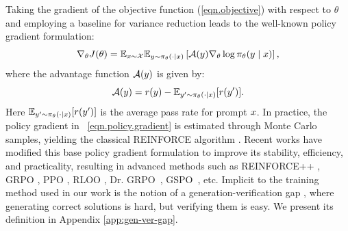 Taking the gradient of the objective function (\ref{eqn.objective}) with respect to $\theta$ and employing a baseline for variance reduction \citep{sutton1998reinforcement} leads to the well-known policy gradient formulation:
\begin{equation}\label{eqn.policy.gradient}
\nabla_{\theta} J(\theta) = \mathbb{E}_{x \sim \mathcal X}\mathbb{E}_{y \sim \pi_\theta(\cdot \mid x)}\left[\mathcal A(y)\nabla_{\theta}\log \pi_\theta(y \mid x)\right],
\end{equation}
where the advantage function $\mathcal A(y)$ is given by:
\begin{equation}\label{eqn.advantage}
\mathcal A(y) = r(y) - \mathbb{E}_{y' \sim \pi_\theta(\cdot \mid x)}[r(y')].
\end{equation}
Here $\mathbb{E}_{y' \sim \pi_\theta(\cdot \mid x)}[r(y')]$ is the average pass rate for prompt $x$.
In practice, the policy gradient in ~\eqref{eqn.policy.gradient} is estimated through Monte Carlo samples, yielding the classical REINFORCE algorithm \citep{williams1992simple}. Recent works have modified this base policy gradient formulation to improve its stability, efficiency, and practicality, resulting in advanced methods such as REINFORCE++ \citep{hu2025reinforceefficientrlhfalgorithm}, GRPO \citep{shao2024deepseekmathpushinglimitsmathematical}, PPO \citep{schulman2017proximal}, RLOO \citep{ahmadian-etal-2024-back}, Dr. GRPO~\citep{liu2025understandingr1zeroliketrainingcritical}, GSPO~\citep{zheng2025groupsequencepolicyoptimization}, etc. Implicit to the training method used in our work is the notion of a generation-verification gap \citep{song2025mind}, where generating correct solutions is hard, but verifying them is easy. We present its definition in Appendix \ref{app:gen-ver-gap}.
